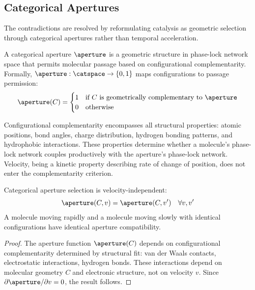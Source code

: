 \subsection{Categorical Apertures}

The contradictions are resolved by reformulating catalysis as geometric selection through categorical apertures rather than temporal acceleration.

\begin{definition}
\label{def:aperture}
A categorical aperture $\aperture$ is a geometric structure in phase-lock network space that permits molecular passage based on configurational complementarity. Formally, $\aperture: \catspace \to \{0, 1\}$ maps configurations to passage permission:
\begin{equation}
\aperture(C) = \begin{cases}
1 & \text{if } C \text{ is geometrically complementary to } \aperture \\
0 & \text{otherwise}
\end{cases}
\end{equation}
\end{definition}

Configurational complementarity encompasses all structural properties: atomic positions, bond angles, charge distribution, hydrogen bonding patterns, and hydrophobic interactions. These properties determine whether a molecule's phase-lock network couples productively with the aperture's phase-lock network. Velocity, being a kinetic property describing rate of change of position, does not enter the complementarity criterion.

\begin{theorem}
\label{thm:aperture_velocity}
Categorical aperture selection is velocity-independent:
\begin{equation}
\aperture(C, v) = \aperture(C, v') \quad \forall v, v'
\end{equation}
A molecule moving rapidly and a molecule moving slowly with identical configurations have identical aperture compatibility.
\end{theorem}

\begin{proof}
The aperture function $\aperture(C)$ depends on configurational complementarity determined by structural fit: van der Waals contacts, electrostatic interactions, hydrogen bonds. These interactions depend on molecular geometry $C$ and electronic structure, not on velocity $v$. Since $\partial \aperture/\partial v = 0$, the result follows.
\end{proof}

